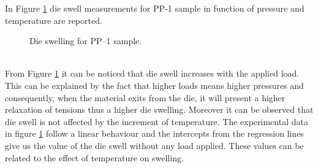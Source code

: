 \documentclass[a4paper, 11pt]{article}
\begin{document}
In Figure \ref{fig:dieswell} die swell measurements for PP-1 sample in function of pressure and temperature are reported.
\begin{figure}[h!]
	\centering
	 \quad 
	\captionsetup{justification=centering}
	\caption{Die swelling for PP–1 sample.}
	\label{fig:dieswell}
\end{figure}\\
From Figure \ref{fig:dieswell} it can be noticed that die swell increases with the applied load. This can be explained by the fact that higher loads means higher pressures and consequently, when the material exits from the die, it will present a higher relaxation of tensions thus a higher die swelling. Moreover it can be observed that die swell is not affected by the increment of temperature. The experimental data in figure \ref{fig:dieswell} follow a linear behaviour and the intercepts from the regression lines give us the value of the die swell without any load applied. These values can be related to the effect of temperature on swelling.
\end{document}
